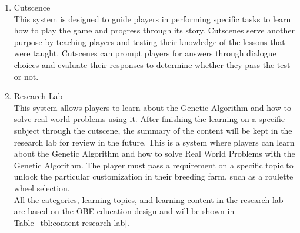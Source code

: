 \documentclass[12pt,oneside,openright,a4paper]{cpe-english-project}
\begin{document}
\begin{itemize}
\begin{itemize}
		\begin{enumerate}
		\item Cutscence \\
		This system is designed to guide players in performing specific tasks to learn how to play the game and progress through its story. Cutscenes serve another purpose by teaching players and testing their knowledge of the lessons that were taught. Cutscenes can prompt players for answers through dialogue choices and evaluate their responses to determine whether they pass the test or not.

		\item Research Lab \\
		This system allows players to learn about the Genetic Algorithm and how to solve real-world problems using it. After finishing the learning on a specific subject through the cutscene, the summary of the content will be kept in the research lab for review in the future.
		This is a system where players can learn about the Genetic Algorithm and how to solve Real World Problems with the Genetic Algorithm. The player must pass a requirement on a specific topic to unlock the particular customization in their breeding farm, such as a roulette wheel selection.\\
		All the categories, learning topics, and learning content in the research lab are based on the OBE education design and will be shown in Table~\ref{tbl:content-research-lab}.


\end{enumerate}
\end{itemize}
\end{itemize}
\end{document}
